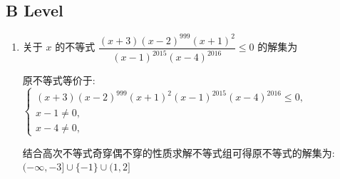 \subsection*{B Level}
\begin{enumerate}
    \item 关于 $x$ 的不等式 $\dfrac{\left( {x + 3}\right) {\left( x - 2\right) }^{999}{\left( x + 1\right) }^{2}}{{\left( x - 1\right) }^{2015}{\left( x - 4\right) }^{2016}} \leq  0$ 的解集为
    \begin{jieda}
        原不等式等价于: $\left\{  \begin{array}{l} \left( {x + 3}\right) {\left( x - 2\right) }^{999}{\left( x + 1\right) }^{2}{\left( x - 1\right) }^{2015}{\left( x - 4\right) }^{2016} \leq  0, \\  x - 1 \neq  0, \\  x - 4 \neq  0, \end{array}\right. $
        
        结合高次不等式奇穿偶不穿的性质求解不等式组可得原不等式的解集为: $(- \infty , - 3 \rbrack  \cup  \{  - 1\}  \cup  (1,2\rbrack$
    \end{jieda} 
    

\end{enumerate}
